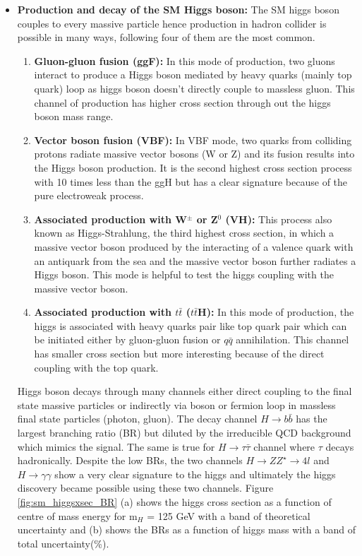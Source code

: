 \begin{itemize}
\item{\textbf{Production and decay of the SM Higgs boson:}} The SM higgs boson couples to every massive particle hence production in hadron collider is possible in many ways, following four of them are the most common.
\begin{enumerate}
\item{\textbf{Gluon-gluon fusion (ggF):}} In this mode of production, two gluons interact to produce a Higgs boson mediated by heavy quarks (mainly top quark) loop as higgs boson doesn't directly couple to massless gluon. This channel of production has higher cross section through out the higgs boson mass range.
\item{\textbf{Vector boson fusion (VBF):}} In VBF mode, two quarks from colliding protons radiate massive vector bosons (W or Z) and its fusion results into the Higgs boson production. It is the second highest cross section process with 10 times less than the ggH but has a clear signature because of the pure electroweak process. 
\item{\textbf{Associated production with W$^{\pm}$ or Z$^{0}$ (VH):}} This process also known as Higgs-Strahlung, the third highest cross section, in which a massive vector boson produced by the interacting of a valence quark with an antiquark from the sea and the massive vector boson further radiates a Higgs boson. This mode is helpful to test the higgs coupling with the massive vector boson.
\item{\textbf{Associated production with $t\bar{t}$ ($t\bar{t}$H):}} In this mode of production, the higgs is associated with heavy quarks pair like top quark pair which can be initiated either by gluon-gluon fusion or $q\bar{q}$ annihilation. This channel has smaller cross section but more interesting because of the direct coupling with the top quark.
\end{enumerate} 
Higgs boson decays through many channels either direct coupling to the final state massive particles or indirectly via boson or fermion loop in massless final state particles (photon, gluon). The decay channel $H\rightarrow b\bar{b}$ has the largest branching ratio (BR) but diluted by the irreducible QCD background which mimics the signal. The same is true for $H\rightarrow \tau\bar{\tau}$ channel where $\tau$ decays hadronically. Despite the low BRs, the two channels $H\rightarrow ZZ^{\star}\rightarrow 4l$ and $H\rightarrow \gamma\gamma$ show a very clear signature to the higgs and ultimately the higgs discovery became possible using these two channels. Figure \ref{fig:sm_higgsxsec_BR} (a) shows the higgs cross section as a function of centre of mass energy for m$_{H}$ = 125 GeV with a band of theoretical uncertainty and (b) shows the BRs as a function of higgs mass with a band of total uncertainty(\%).     
\end{itemize} 
